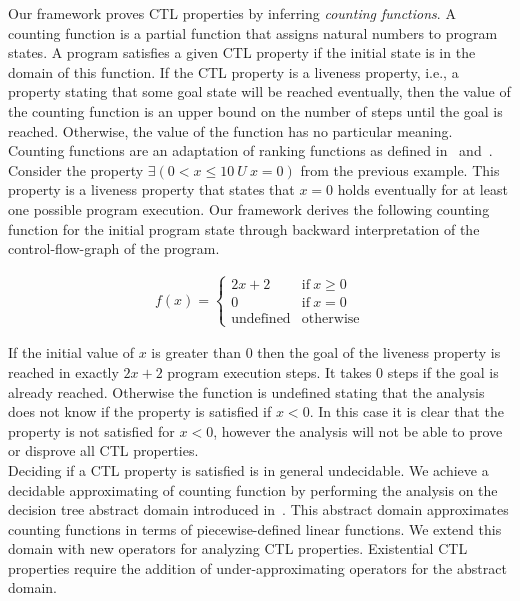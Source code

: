 \documentclass[11pt,a4paper,titlepage]{article}
\theoremstyle{definition}
\begin{document}
Our framework proves CTL properties by inferring \emph{counting functions}. 
A counting function is a partial function that assigns 
natural numbers to program states. A program satisfies a given CTL property if the initial state is in the domain of this function. 
If the CTL property is a liveness property, i.e., a property stating that some goal state will be reached eventually, 
then the value of the counting function is an upper bound on the number of steps until the goal is reached. 
Otherwise, the value of the function has no particular meaning. Counting functions are an adaptation of ranking functions 
as defined in~\cite{CousotCousot-POPL12} and~\cite{UrbanM-VMCAI15}.\\

Consider the property 
$\exists(0 < x \leq 10 \ U \ x = 0)$ from the previous example. This property is a liveness property that states that $x = 0$ holds eventually for at least
one possible program execution. Our framework derives the following counting function for the initial program state 
through backward interpretation of the control-flow-graph of the program. 

\begin{align*}
f(x) = \begin{cases}
    2x + 2 & \text{if} \ x \geq 0 \\
    0 & \text{if} \ x = 0 \\
    \text{undefined}    & \text{otherwise}
\end{cases}
\end{align*}

If the initial value of $x$ is greater than $0$ then the goal of the liveness property is reached in exactly $2x + 2$ program execution steps.
It takes $0$ steps if the goal is already reached. Otherwise the function is undefined stating that the analysis does not know if the property 
is satisfied if $x < 0$. In this case it is clear that the property is not satisfied for $x < 0$, however the analysis will not be able to 
prove or disprove all CTL properties.\\

Deciding if a CTL property is satisfied is in general undecidable. We achieve a decidable approximating of counting function by performing
the analysis on the decision tree abstract domain introduced in~\cite{UrbanPhd}. This abstract domain approximates counting functions in terms of 
piecewise-defined linear functions. We extend this domain with new operators for analyzing CTL properties. Existential CTL properties
require the addition of under-approximating operators for the abstract domain.\\
\end{document}
